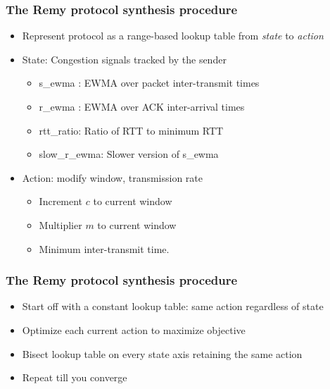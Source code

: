 \begin{frame}
\frametitle{The Remy protocol synthesis procedure}
\begin{itemize}
\item<1-> Represent protocol as a range-based lookup table from \textit{state} to \textit{action}
\item<2-> State: Congestion signals tracked by the sender
\begin{itemize}
\item s\_ewma : EWMA over packet inter-transmit times
\item r\_ewma : EWMA over ACK inter-arrival times
\item rtt\_ratio: Ratio of RTT to minimum RTT
\item slow\_r\_ewma: Slower version of s\_ewma
\end{itemize}
\item<3-> Action: modify window, transmission rate
\begin{itemize}
\item Increment $c$ to current window
\item Multiplier $m$ to current window
\item Minimum inter-transmit time.
\end{itemize}
\end{itemize}
\end{frame}

\begin{frame}
\frametitle{The Remy protocol synthesis procedure}
\begin{itemize}
\item Start off with a constant lookup table: same action regardless of state
\item Optimize each current action to maximize objective
\item Bisect lookup table on every state axis retaining the same action
\item Repeat till you converge
\end{itemize}
\end{frame}

